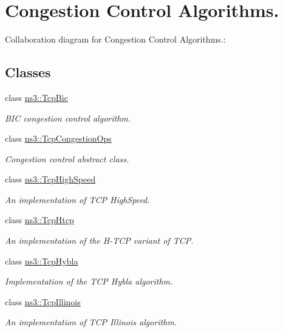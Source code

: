 \hypertarget{group__congestionOps}{}\section{Congestion Control Algorithms.}
\label{group__congestionOps}
Collaboration diagram for Congestion Control Algorithms.\+:
\subsection*{Classes}
\begin{DoxyCompactItemize}
\item 
class \hyperlink{classns3_1_1TcpBic}{ns3\+::\+Tcp\+Bic}
\begin{DoxyCompactList}\small\item\em B\+IC congestion control algorithm. \end{DoxyCompactList}\item 
class \hyperlink{classns3_1_1TcpCongestionOps}{ns3\+::\+Tcp\+Congestion\+Ops}
\begin{DoxyCompactList}\small\item\em Congestion control abstract class. \end{DoxyCompactList}\item 
class \hyperlink{classns3_1_1TcpHighSpeed}{ns3\+::\+Tcp\+High\+Speed}
\begin{DoxyCompactList}\small\item\em An implementation of T\+CP High\+Speed. \end{DoxyCompactList}\item 
class \hyperlink{classns3_1_1TcpHtcp}{ns3\+::\+Tcp\+Htcp}
\begin{DoxyCompactList}\small\item\em An implementation of the H-\/\+T\+CP variant of T\+CP. \end{DoxyCompactList}\item 
class \hyperlink{classns3_1_1TcpHybla}{ns3\+::\+Tcp\+Hybla}
\begin{DoxyCompactList}\small\item\em Implementation of the T\+CP Hybla algorithm. \end{DoxyCompactList}\item 
class \hyperlink{classns3_1_1TcpIllinois}{ns3\+::\+Tcp\+Illinois}
\begin{DoxyCompactList}\small\item\em An implementation of T\+CP Illinois algorithm. \end{DoxyCompactList}\item 

\end{DoxyCompactItemize}
